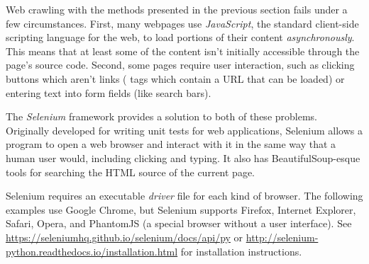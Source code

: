 Web crawling with the methods presented in the previous section fails under a few circumstances.
First, many webpages use \emph{JavaScript}, the standard client-side scripting language for the web, to load portions of their content  \emph{asynchronously}.
This means that at least some of the content isn't initially accessible through the page's source code.
Second, some pages require user interaction, such as clicking buttons which aren't links ( tags which contain a URL that can be loaded) or entering text into form fields (like search bars).

\begin{comment} %
Navigate to the website \url{http://www.simplesoccerstats.com/stats/teamstats.php?lge=14&type=goals&season=0}.
Notice that there is a row for the Chicago team displayed in the browser.
Open up the page source,
Hit \li{ctrl+f} and search for ``Chicago''.
Notice that it isn't there.
The following code will produce a similar result:

\begin{lstlisting}
>>> soccer_url = 'http://www.simplesoccerstats.com/stats/teamstats.php?lge=14&type=goals&season=0'
>>> soccer_content = requests.get(soccer_url).text
>>> soccer_soup = BeautifulSoup(soccer_content)

>>> print(soccer_soup.find(string='Chicago'))
<<None>>
\end{lstlisting}
Still nothing.
This means the actual table of information is loaded asynchronously.
\end{comment}

The \emph{Selenium} framework provides a solution to both of these problems.
Originally developed for writing unit tests for web applications, Selenium allows a program to open a web browser and interact with it in the same way that a human user would, including clicking and typing.
It also has BeautifulSoup-esque tools for searching the HTML source of the current page.


\begin{info} %
Selenium requires an executable \emph{driver} file for each kind of browser.
The following examples use Google Chrome, but Selenium supports Firefox, Internet Explorer, Safari, Opera, and PhantomJS (a special browser without a user interface).
See \url{https://seleniumhq.github.io/selenium/docs/api/py} or \url{http://selenium-python.readthedocs.io/installation.html} for installation instructions.
\end{info}

